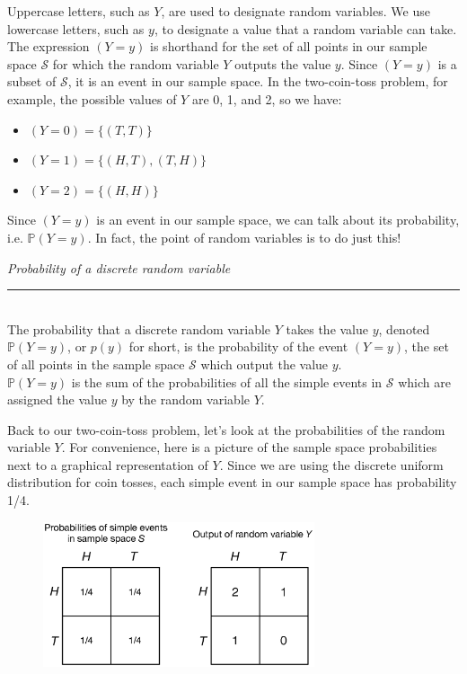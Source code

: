 \documentclass[12pt]{article}
\theoremstyle{definition}
\theoremstyle{remark}
\def\P{{\mathbb P}}
\def\cals{{\mathcal S}}
\begin{document}
Uppercase letters, such as $Y$, are used to designate random variables. We use lowercase letters, such as $y$, to designate a value that a random variable can take. The expression $(Y = y)$ is shorthand for the set of all points in our sample space $\cals$ for which the random variable $Y$ outputs the value $y$. Since $(Y = y)$ is a subset of $\cals$, it is an event in our sample space. In the two-coin-toss problem, for example, the possible values of $Y$ are 0, 1, and 2, so we have:
\begin{itemize}[noitemsep]
\item $(Y = 0) = \{ (T, T) \}$
\item $(Y = 1) = \{ (H, T), (T, H) \}$
\item $(Y = 2) = \{ (H, H) \}$
\end{itemize}

Since $(Y = y)$ is an event in our sample space, we can talk about its probability, i.e. $\P(Y = y)$. In fact, the point of random variables is to do just this! 

\begin{framed}
  \emph{Probability of a discrete random variable }\\
  \rule{\dimexpr{}\fboxrule}{.1pt} \\
  The probability that a discrete random variable $Y$ takes the value $y$, denoted $\P(Y = y)$, or $p(y)$ for short, is the probability of the event $(Y = y)$, the set of all points in the sample space $\cals$ which output the value $y$. \\

  $\P(Y = y)$ is the sum of the probabilities of all the simple events in $\cals$ which are assigned the value $y$ by the random variable $Y$.
\end{framed}

Back to our two-coin-toss problem, let's look at the probabilities of the random variable $Y$. For convenience, here is a picture of the sample space probabilities next to a graphical representation of $Y$. Since we are using the discrete uniform distribution for coin tosses, each simple event in our sample space has probability 1/4.
\begin{figure}[H]
\centering
\includegraphics[width=8cm]{numberofheads2.eps}
\end{figure}
\end{document}

